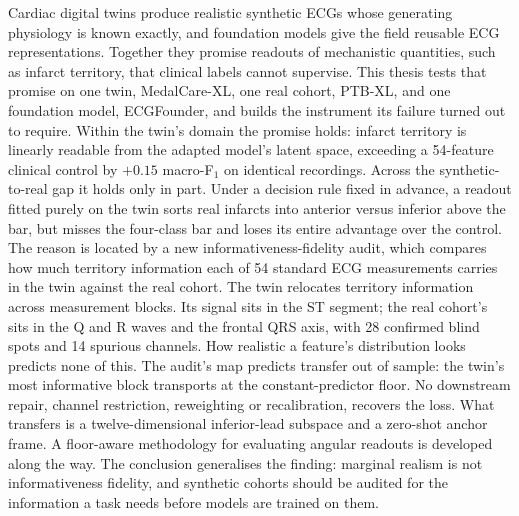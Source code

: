 Cardiac digital twins produce realistic synthetic ECGs whose generating physiology is known exactly, and foundation models give the field reusable ECG representations. Together they promise readouts of mechanistic quantities, such as infarct territory, that clinical labels cannot supervise. This thesis tests that promise on one twin, MedalCare-XL, one real cohort, PTB-XL, and one foundation model, ECGFounder, and builds the instrument its failure turned out to require. Within the twin's domain the promise holds: infarct territory is linearly readable from the adapted model's latent space, exceeding a 54-feature clinical control by $+0.15$ macro-F$_1$ on identical recordings. Across the synthetic-to-real gap it holds only in part. Under a decision rule fixed in advance, a readout fitted purely on the twin sorts real infarcts into anterior versus inferior above the bar, but misses the four-class bar and loses its entire advantage over the control. The reason is located by a new informativeness-fidelity audit, which compares how much territory information each of 54 standard ECG measurements carries in the twin against the real cohort. The twin relocates territory information across measurement blocks. Its signal sits in the ST segment; the real cohort's sits in the Q and R waves and the frontal QRS axis, with 28 confirmed blind spots and 14 spurious channels. How realistic a feature's distribution looks predicts none of this. The audit's map predicts transfer out of sample: the twin's most informative block transports at the constant-predictor floor. No downstream repair, channel restriction, reweighting or recalibration, recovers the loss. What transfers is a twelve-dimensional inferior-lead subspace and a zero-shot anchor frame. A floor-aware methodology for evaluating angular readouts is developed along the way. The conclusion generalises the finding: marginal realism is not informativeness fidelity, and synthetic cohorts should be audited for the information a task needs before models are trained on them.
